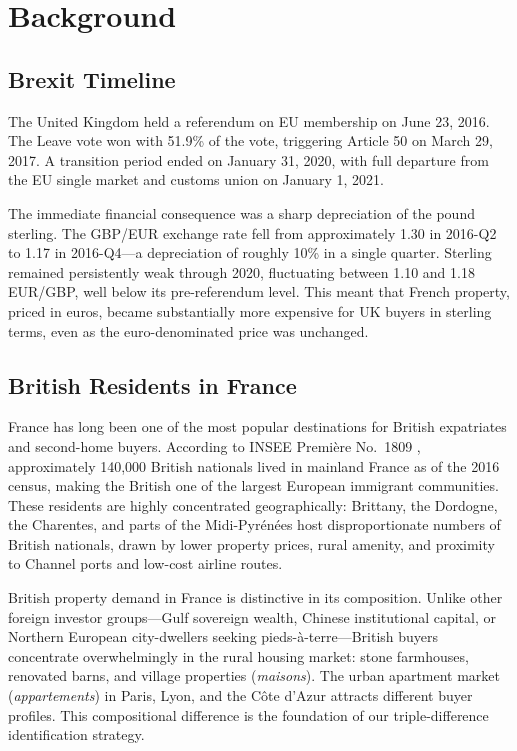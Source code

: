 \documentclass[12pt]{article}
\begin{document}
\section{Background}\label{sec:background}

\subsection{Brexit Timeline}

The United Kingdom held a referendum on EU membership on June 23, 2016. The Leave vote won with 51.9\% of the vote, triggering Article 50 on March 29, 2017. A transition period ended on January 31, 2020, with full departure from the EU single market and customs union on January 1, 2021.

The immediate financial consequence was a sharp depreciation of the pound sterling. The GBP/EUR exchange rate fell from approximately 1.30 in 2016-Q2 to 1.17 in 2016-Q4---a depreciation of roughly 10\% in a single quarter. Sterling remained persistently weak through 2020, fluctuating between 1.10 and 1.18 EUR/GBP, well below its pre-referendum level. This meant that French property, priced in euros, became substantially more expensive for UK buyers in sterling terms, even as the euro-denominated price was unchanged.

\subsection{British Residents in France}

France has long been one of the most popular destinations for British expatriates and second-home buyers. According to INSEE Premi\`ere No.\ 1809 \citep{insee2019premiere}, approximately 140,000 British nationals lived in mainland France as of the 2016 census, making the British one of the largest European immigrant communities. These residents are highly concentrated geographically: Brittany, the Dordogne, the Charentes, and parts of the Midi-Pyr\'en\'ees host disproportionate numbers of British nationals, drawn by lower property prices, rural amenity, and proximity to Channel ports and low-cost airline routes.

British property demand in France is distinctive in its composition. Unlike other foreign investor groups---Gulf sovereign wealth, Chinese institutional capital, or Northern European city-dwellers seeking pieds-\`a-terre---British buyers concentrate overwhelmingly in the rural housing market: stone farmhouses, renovated barns, and village properties (\textit{maisons}). The urban apartment market (\textit{appartements}) in Paris, Lyon, and the C\^ote d'Azur attracts different buyer profiles. This compositional difference is the foundation of our triple-difference identification strategy.
\end{document}
